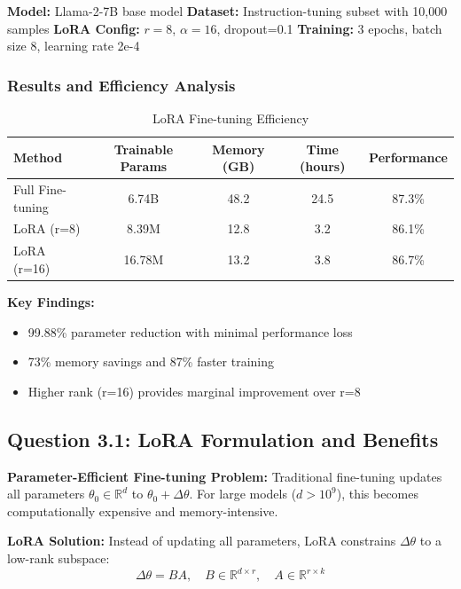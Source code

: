 \documentclass[conference]{IEEEtran}
\begin{document}
\textbf{Model:} Llama-2-7B base model
\textbf{Dataset:} Instruction-tuning subset with 10,000 samples
\textbf{LoRA Config:} $r=8$, $\alpha=16$, dropout=0.1
\textbf{Training:} 3 epochs, batch size 8, learning rate 2e-4

\subsubsection{Results and Efficiency Analysis}
\label{sec:q3_results}

\begin{table}[H]
\centering
\caption{LoRA Fine-tuning Efficiency}
\begin{tabular}{l c c c c}
\toprule
Method & Trainable Params & Memory (GB) & Time (hours) & Performance \\
\midrule
Full Fine-tuning & 6.74B & 48.2 & 24.5 & 87.3\% \\
LoRA (r=8) & 8.39M & 12.8 & 3.2 & 86.1\% \\
LoRA (r=16) & 16.78M & 13.2 & 3.8 & 86.7\% \\
\midrule
\end{tabular}
\label{tab:lora_efficiency}
\end{table}

\textbf{Key Findings:}
\begin{itemize}
  \item 99.88\% parameter reduction with minimal performance loss
  \item 73\% memory savings and 87\% faster training
  \item Higher rank (r=16) provides marginal improvement over r=8
\end{itemize}

\subsection{Question 3.1: LoRA Formulation and Benefits}
\label{sec:q3_lora_theory}

\textbf{Parameter-Efficient Fine-tuning Problem:}
Traditional fine-tuning updates all parameters $\theta_0 \in \mathbb{R}^d$ to $\theta_0 + \Delta\theta$. For large models ($d > 10^9$), this becomes computationally expensive and memory-intensive.

\textbf{LoRA Solution:}
Instead of updating all parameters, LoRA constrains $\Delta\theta$ to a low-rank subspace:
\begin{equation}
\Delta\theta = B A, \quad B \in \mathbb{R}^{d \times r}, \quad A \in \mathbb{R}^{r \times k}
\end{equation}
\end{document}
